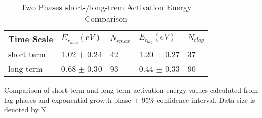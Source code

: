 
\begin{table}[ht]
\centering
\begin{tabular}{lllll}
  \hline
  Time Scale & $E_{r_{max}}(eV)$ & $N_{rmax}$ & $E_{t_{lag}}(eV)$ & $N_{tlag}$ \\ 
  \hline
  short term & 1.02 $\pm$ 0.24 & 42 & 1.20 $\pm$ 0.27 & 37 \\ 
  long term &  0.68 $\pm$ 0.30 & 93 & 0.44 $\pm$ 0.33 & 90 \\ 
  \hline
\end{tabular}

\caption{Two Phases short-/long-trem Activation Energy Comparison}
{\footnotesize Comparison of short-term and long-term activation energy values calculated from lag phases and exponential growth phase $\pm$ 95\% confidence interval. Data size is denoted by N}
\label{table:E_mean}

\end{table}




